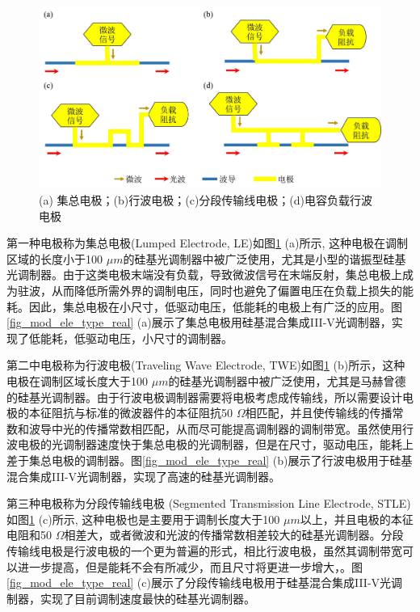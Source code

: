 \begin{figure}[htb]
	\centering
	\includegraphics[width=12cm]{./Pictures/fig_mod_ele_type.jpg}
	\caption{ (a) 集总电极；(b)行波电极；(c)分段传输线电极；(d)电容负载行波电极}
	\label{fig_mod_ele_type}
\end{figure}

第一种电极称为集总电极(Lumped Electrode, LE)如图\ref{fig_mod_ele_type} (a)所示, 这种电极在调制区域的长度小于100 $\mu m$的硅基光调制器中被广泛使用，尤其是小型的谐振型硅基光调制器。由于这类电极末端没有负载，导致微波信号在末端反射，集总电极上成为驻波，从而降低所需外界的调制电压，同时也避免了偏置电压在负载上损失的能耗。因此，集总电极在小尺寸，低驱动电压，低能耗的电极上有广泛的应用。图\ref{fig_mod_ele_type_real} (a)展示了集总电极用硅基混合集成III-V光调制器\cite{tang2012energy}，实现了低能耗，低驱动电压，小尺寸的调制器。

第二中电极称为行波电极(Traveling Wave Electrode, TWE)如图\ref{fig_mod_ele_type} (b)所示，这种电极在调制区域长度大于100 $\mu m$的硅基光调制器中被广泛使用，尤其是马赫曾德的硅基光调制器。由于行波电极调制器需要将电极考虑成传输线，所以需要设计电极的本征阻抗与标准的微波器件的本征阻抗50 $\Omega$相匹配，并且使传输线的传播常数和波导中光的传播常数相匹配，从而尽可能提高调制器的调制带宽。虽然使用行波电极的光调制器速度快于集总电极的光调制器，但是在尺寸，驱动电压，能耗上差于集总电极的调制器。图\ref{fig_mod_ele_type_real} (b)展示了行波电极用于硅基混合集成III-V光调制器\cite{tang2012energy}，实现了高速的硅基光调制器。

第三种电极称为分段传输线电极 (Segmented Transmission Line Electrode, STLE) 如图\ref{fig_mod_ele_type} (c)所示, 这种电极也是主要用于调制长度大于100 $\mu m$以上，并且电极的本征电阻和50 $\Omega$相差大，或者微波和光波的传播常数相差较大的硅基光调制器。分段传输线电极是行波电极的一个更为普遍的形式，相比行波电极，虽然其调制带宽可以进一步提高，但是能耗不会有所减少，而且尺寸将更进一步增大，。图\ref{fig_mod_ele_type_real} (c)展示了分段传输线电极用于硅基混合集成III-V光调制器\cite{tang2012energy}，实现了目前调制速度最快的硅基光调制器。

